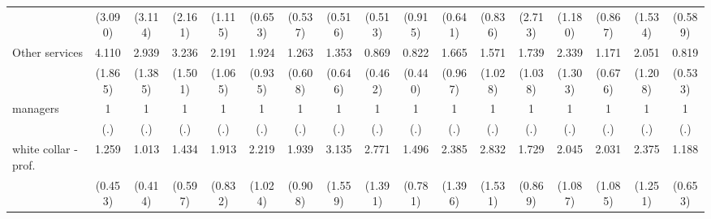 {\begin{tabular}{l*{16}{c}}
                    &     (3.090)         &     (3.114)         &     (2.161)         &     (1.115)         &     (0.653)         &     (0.537)         &     (0.516)         &     (0.513)         &     (0.915)         &     (0.641)         &     (0.836)         &     (2.713)         &     (1.180)         &     (0.867)         &     (1.534)         &     (0.589)         \\
[1em]
Other services      &       4.110\sym{**} &       2.939\sym{*}  &       3.236\sym{*}  &       2.191         &       1.924         &       1.263         &       1.353         &       0.869         &       0.822         &       1.665         &       1.571         &       1.739         &       2.339         &       1.171         &       2.051         &       0.819         \\
                    &     (1.865)         &     (1.385)         &     (1.501)         &     (1.065)         &     (0.935)         &     (0.608)         &     (0.646)         &     (0.462)         &     (0.440)         &     (0.967)         &     (1.028)         &     (1.038)         &     (1.303)         &     (0.676)         &     (1.208)         &     (0.533)         \\
[1em]
managers            &           1         &           1         &           1         &           1         &           1         &           1         &           1         &           1         &           1         &           1         &           1         &           1         &           1         &           1         &           1         &           1         \\
                    &         (.)         &         (.)         &         (.)         &         (.)         &         (.)         &         (.)         &         (.)         &         (.)         &         (.)         &         (.)         &         (.)         &         (.)         &         (.)         &         (.)         &         (.)         &         (.)         \\
[1em]
white collar - prof.&       1.259         &       1.013         &       1.434         &       1.913         &       2.219         &       1.939         &       3.135\sym{*}  &       2.771\sym{*}  &       1.496         &       2.385         &       2.832         &       1.729         &       2.045         &       2.031         &       2.375         &       1.188         \\
                    &     (0.453)         &     (0.414)         &     (0.597)         &     (0.832)         &     (1.024)         &     (0.908)         &     (1.559)         &     (1.391)         &     (0.781)         &     (1.396)         &     (1.531)         &     (0.869)         &     (1.087)         &     (1.085)         &     (1.251)         &     (0.653)         \\

\end{tabular}}

